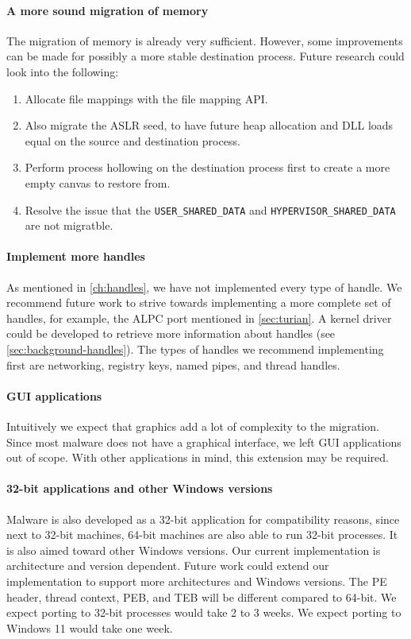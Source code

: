 \documentclass[a4paper, 11pt, english]{report}
\begin{document}
\paragraph{A more sound migration of memory} The migration of memory is already very sufficient. However, some improvements can be made for possibly a more stable destination process. Future research could look into the following: 
\begin{enumerate}
	\item Allocate file mappings with the file mapping API. 
	\item Also migrate the ASLR seed, to have future heap allocation and DLL loads equal on the source and destination process. 
	\item Perform process hollowing on the destination process first to create a more empty canvas to restore from. 
	\item Resolve the issue that the \texttt{USER\_SHARED\_DATA} and \texttt{HYPERVISOR\_SHARED\_DATA }are not migratble.
\end{enumerate}

\paragraph{Implement more handles}
As mentioned in \autoref{ch:handles}, we have not implemented every type of handle. We recommend future work to strive towards implementing a more complete set of handles, for example, the ALPC port mentioned in \autoref{sec:turian}. A kernel driver could be developed to retrieve more information about handles (see \autoref{sec:background-handles}). The types of handles we recommend implementing first are networking, registry keys, named pipes, and thread handles.

\paragraph{GUI applications}
Intuitively we expect that graphics add a lot of complexity to the migration. Since most malware does not have a graphical interface, we left GUI applications out of scope. With other applications in mind, this extension may be required.

\paragraph{32-bit applications and other Windows versions}
Malware is also developed as a 32-bit application for compatibility reasons, since next to 32-bit machines, 64-bit machines are also able to run 32-bit processes. It is also aimed toward other Windows versions. Our current implementation is architecture and version dependent. Future work could extend our implementation to support more architectures and Windows versions. The PE header, thread context, PEB, and TEB will be different compared to 64-bit. We expect porting to 32-bit processes would take 2 to 3 weeks. We expect porting to Windows 11 would take one week.
\end{document}
